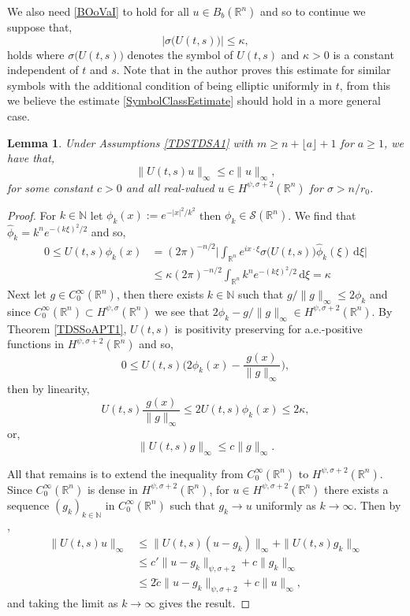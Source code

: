 \documentclass[a4paper, 12pt]{report}
\newtheorem{lemma}[theorem]{Lemma}
\theoremstyle{remark}
\theoremstyle{definition}
\begin{document}
We also need \eqref{BOoVaI} to hold for all $u \in B_b(\mathbb{R}^n)$ and so to continue we suppose that,
\begin{equation}
\big|\sigma\big(U(t, s)\big)\big| \le \kappa,\label{SymbolClassEstimate}
\end{equation}
holds where $\sigma\big(U(t, s)\big)$ denotes the symbol of $U(t, s)$ and $\kappa > 0$ is a constant independent of $t$ and $s$.  Note that in \cite{KernelPaper} the author proves this estimate for similar symbols with the additional condition of being elliptic uniformly in $t$, from this we believe the estimate \eqref{SymbolClassEstimate} should hold in a more general case.
\begin{lemma}\label{TDSSoAPL1.5}
Under Assumptions \ref{TDSTDSA1} with $m \ge n + \lfloor a \rfloor + 1$ for $a \ge 1$, we have that,
\begin{equation}
\|U(t, s)u\|_\infty \le c\|u\|_\infty,
\end{equation}
for some constant $c > 0$ and all real-valued $u \in H^{\psi, \sigma + 2}(\mathbb{R}^n)$ for $\sigma > n/r_0$.
\end{lemma}
\begin{proof}
For $k \in \mathbb{N}$ let $\phi_k(x) := e^{-|x|^2/k^2}$ then $\phi_k \in \mathcal{S}(\mathbb{R}^n)$.  We find that $\hat{\phi}_k = k^ne^{-(k\xi)^2/2}$ and so,
$$
\begin{aligned}
0 \le U(t, s)\phi_k(x) & = (2\pi)^{-n/2}\bigg|\int_{\mathbb{R}^n}e^{ix\cdot\xi}\sigma\big(U(t, s)\big)\hat{\phi}_k(\xi)\,\mathrm{d}\xi\bigg|\\
& \le \kappa(2\pi)^{-n/2}\int_{\mathbb{R}^n}k^ne^{-(k\xi)^2/2}\,\mathrm{d}\xi = \kappa
\end{aligned}
$$
Next let $g \in C_0^\infty(\mathbb{R}^n)$, then there exists $k \in \mathbb{N}$ such that $g/\|g\|_\infty \le 2\phi_k$ and since $C_0^\infty(\mathbb{R}^n) \subset H^{\psi, \sigma}(\mathbb{R}^n)$ we see that $2\phi_k - g/\|g\|_\infty \in H^{\psi, \sigma + 2}(\mathbb{R}^n)$.  By Theorem \ref{TDSSoAPT1}, $U(t, s)$ is positivity preserving for a.e.-positive functions in $H^{\psi, \sigma + 2}(\mathbb{R}^n)$ and so,
$$
0 \le U(t, s)\bigg(2\phi_k(x) - \frac{g(x)}{\|g\|_\infty}\bigg),
$$
then by linearity,
$$
U(t, s)\frac{g(x)}{\|g\|_\infty} \le 2U(t, s)\phi_k(x) \le 2\kappa,
$$
or,
$$
\|U(t, s)g\|_\infty \le c\|g\|_\infty.
$$

All that remains is to extend the inequality from $C_0^\infty(\mathbb{R}^n)$ to $H^{\psi, \sigma + 2}(\mathbb{R}^n)$.  Since $C_0^\infty(\mathbb{R}^n)$ is dense in $H^{\psi, \sigma + 2}(\mathbb{R}^n)$, for $u \in H^{\psi, \sigma + 2}(\mathbb{R}^n)$ there exists a sequence $(g_k)_{k \in \mathbb{N}}$ in $C_0^\infty(\mathbb{R}^n)$ such that $g_k \to u$ uniformly as $k \to \infty$.  Then by \cite[Section 7]{RZ},
$$
\begin{aligned}
\|U(t, s)u\|_\infty & \le \|U(t, s)(u - g_k)\|_\infty + \|U(t, s)g_k\|_\infty\\
& \le c'\|u - g_k\|_{\psi, \sigma + 2} + c\|g_k\|_\infty\\
& \le 2\tilde{c}\|u - g_k\|_{\psi, \sigma + 2} + c\|u\|_\infty,
\end{aligned}
$$
and taking the limit as $k \to \infty$ gives the result.
\end{proof}
\end{document}
